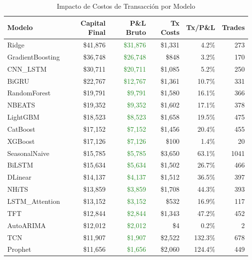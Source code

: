 \begin{table}[htbp]
\centering
\caption{Impacto de Costos de Transacci\'on por Modelo}
\label{tab:cost_breakdown}
\small
\begin{tabular}{@{}lrrrrr@{}}
\toprule
\textbf{Modelo} & \textbf{Capital Final} & \textbf{P\&L Bruto} & \textbf{Tx Costs} & \textbf{Tx/P\&L} & \textbf{Trades} \\
\midrule
Ridge & \$41,876 & \textcolor{ForestGreen}{\$31,876} & \$1,331 & 4.2\% & 273 \\
GradientBoosting & \$36,748 & \textcolor{ForestGreen}{\$26,748} & \$848 & 3.2\% & 170 \\
CNN\_LSTM & \$30,711 & \textcolor{ForestGreen}{\$20,711} & \$1,085 & 5.2\% & 250 \\
BiGRU & \$22,767 & \textcolor{ForestGreen}{\$12,767} & \$1,361 & 10.7\% & 331 \\
RandomForest & \$19,791 & \textcolor{ForestGreen}{\$9,791} & \$1,580 & 16.1\% & 366 \\
NBEATS & \$19,352 & \textcolor{ForestGreen}{\$9,352} & \$1,602 & 17.1\% & 378 \\
LightGBM & \$18,523 & \textcolor{ForestGreen}{\$8,523} & \$1,658 & 19.5\% & 475 \\
CatBoost & \$17,152 & \textcolor{ForestGreen}{\$7,152} & \$1,456 & 20.4\% & 455 \\
XGBoost & \$17,126 & \textcolor{ForestGreen}{\$7,126} & \$100 & 1.4\% & 20 \\
SeasonalNaive & \$15,785 & \textcolor{ForestGreen}{\$5,785} & \$3,650 & 63.1\% & 1041 \\
BiLSTM & \$15,634 & \textcolor{ForestGreen}{\$5,634} & \$1,502 & 26.7\% & 466 \\
DLinear & \$14,137 & \textcolor{ForestGreen}{\$4,137} & \$1,512 & 36.5\% & 397 \\
NHiTS & \$13,859 & \textcolor{ForestGreen}{\$3,859} & \$1,708 & 44.3\% & 393 \\
LSTM\_Attention & \$13,152 & \textcolor{ForestGreen}{\$3,152} & \$532 & 16.9\% & 117 \\
TFT & \$12,844 & \textcolor{ForestGreen}{\$2,844} & \$1,343 & 47.2\% & 452 \\
AutoARIMA & \$12,012 & \textcolor{ForestGreen}{\$2,012} & \$4 & 0.2\% & 2 \\
TCN & \$11,907 & \textcolor{ForestGreen}{\$1,907} & \$2,522 & 132.3\% & 678 \\
Prophet & \$11,656 & \textcolor{ForestGreen}{\$1,656} & \$2,060 & 124.4\% & 449 \\

\end{tabular}
\end{table}
